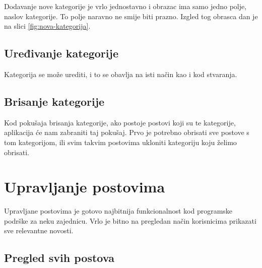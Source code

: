 \documentclass[zavrsni, numeric]{fer}
\begin{document}
Dodavanje nove kategorije je vrlo jednostavno i obrazac ima samo jedno polje, naslov kategorije. To polje naravno ne smije biti prazno. Izgled tog obrasca dan je na slici \ref{fig:nova-kategorija}.

\subsection{Uređivanje kategorije}
Kategorija se može urediti, i to se obavlja na isti način kao i kod stvaranja.

\subsection{Brisanje kategorije}
Kod pokušaja brisanja kategorije, ako postoje postovi koji su te kategorije, aplikacija će nam zabraniti taj pokušaj. Prvo je potrebno obrisati sve postove s tom kategorijom, ili svim takvim postovima ukloniti kategoriju koju želimo obrisati.

\section{Upravljanje postovima}
Upravljane postovima je gotovo najbitnija funkcionalnost kod programske podrške za neku zajednicu. Vrlo je bitno na pregledan način korisnicima prikazati sve relevantne novosti.

\subsection{Pregled svih postova}
\end{document}
